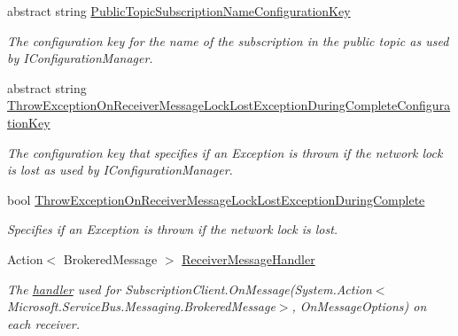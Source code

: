 \begin{DoxyCompactItemize}
abstract string \hyperlink{classCqrs_1_1Azure_1_1ServiceBus_1_1AzureServiceBus_afd2996c47ea248fd1b70ad8077dcd215_afd2996c47ea248fd1b70ad8077dcd215}{Public\+Topic\+Subscription\+Name\+Configuration\+Key}
\begin{DoxyCompactList}\small\item\em The configuration key for the name of the subscription in the public topic as used by I\+Configuration\+Manager. \end{DoxyCompactList}\item 
abstract string \hyperlink{classCqrs_1_1Azure_1_1ServiceBus_1_1AzureServiceBus_a29a4fb4d6f85c649e699cd5e7f0b4d1d_a29a4fb4d6f85c649e699cd5e7f0b4d1d}{Throw\+Exception\+On\+Receiver\+Message\+Lock\+Lost\+Exception\+During\+Complete\+Configuration\+Key}
\begin{DoxyCompactList}\small\item\em The configuration key that specifies if an Exception is thrown if the network lock is lost as used by I\+Configuration\+Manager. \end{DoxyCompactList}\item 
bool \hyperlink{classCqrs_1_1Azure_1_1ServiceBus_1_1AzureServiceBus_afd7c5f3b9caa1ce88bcd8be049bbf099_afd7c5f3b9caa1ce88bcd8be049bbf099}{Throw\+Exception\+On\+Receiver\+Message\+Lock\+Lost\+Exception\+During\+Complete}
\begin{DoxyCompactList}\small\item\em Specifies if an Exception is thrown if the network lock is lost. \end{DoxyCompactList}\item 
Action$<$ Brokered\+Message $>$ \hyperlink{classCqrs_1_1Azure_1_1ServiceBus_1_1AzureServiceBus_ab662579a9bd5be761a23f43e739ff288_ab662579a9bd5be761a23f43e739ff288}{Receiver\+Message\+Handler}
\begin{DoxyCompactList}\small\item\em The \hyperlink{}{handler} used for Subscription\+Client.\+On\+Message(\+System.\+Action$<$\+Microsoft.\+Service\+Bus.\+Messaging.\+Brokered\+Message$>$, On\+Message\+Options) on each receiver. \end{DoxyCompactList}\item 

\end{DoxyCompactItemize}

